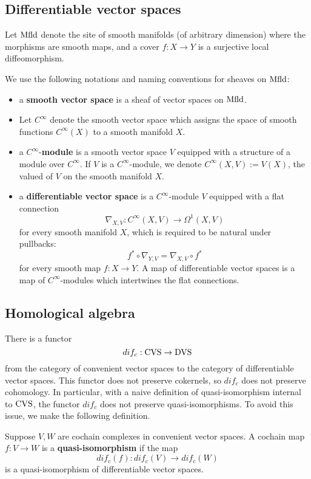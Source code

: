 \documentclass[10pt, oneside]{article}
\begin{document}
\subsection{Differentiable vector spaces}
\def\Mfld{{\rm Mfld}}

Let $\Mfld$ denote the site of smooth manifolds (of arbitrary dimension) where the morphisms are smooth maps, and a cover $f : X \to Y$ is a surjective local diffeomorphism.  

\begin{definition} 
We use the following notations and naming conventions for sheaves on $\Mfld$:
\begin{itemize}
\item a {\bf smooth vector space} is a sheaf of vector spaces on $\Mfld$.
\item Let $C^\infty$ denote the smooth vector space which assigns the space of smooth functions $C^\infty(X)$ to a smooth manifold $X$.
\item a $C^\infty$-{\bf module} is a smooth vector space $V$ equipped with a structure of a module over $C^\infty$. 
If $V$ is a $C^\infty$-module, we denote $C^\infty(X, V) := V(X)$, the valued of $V$ on the smooth manifold $X$.
\item a {\bf differentiable vector space} is a $C^\infty$-module $V$ equipped with a flat connection
\[
\nabla_{X,V} : C^\infty(X, V) \to \Omega^1(X, V)
\]
for every smooth manifold $X$, which is required to be natural under pullbacks:
\[
f^* \circ \nabla_{Y,V} = \nabla_{X,V} \circ f^*
\]
for every smooth map $f : X \to Y$. 
A map of differentiable vector spaces is a map of $C^\infty$-modules which intertwines the flat connections. 
\end{itemize}
\end{definition}

\subsection{Homological algebra}

There is a functor
\[
dif_c : {\rm CVS} \to {\rm DVS} 
\]
from the category of convenient vector spaces to the category of differentiable vector spaces. 
This functor does not preserve cokernels, so $dif_c$ does not preserve cohomology. 
In particular, with a naive definition of quasi-isomorphism internal to ${\rm CVS}$, the functor $dif_c$ does not preserve quasi-isomorphisms. 
To avoid this issue, we make the following definition. 

\begin{definition}
Suppose $V,W$ are cochain complexes in convenient vector spaces. 
A cochain map $f : V \to W$ is a {\bf quasi-isomorphism} if the map
\[
dif_c (f) : dif_c(V) \to dif_c(W)
\]
is a quasi-isomorphism of differentiable vector spaces.
\end{definition}
\end{document}
